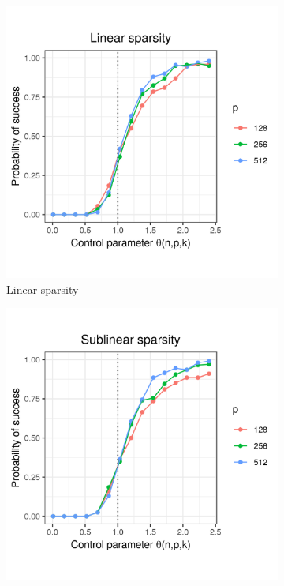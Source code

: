 \documentclass[letterpaper,12pt]{article}
\begin{document}
\begin{figure}[h]
  \centering
  \begin{subfigure}{0.32\textwidth}
    \includegraphics[width=0.9\linewidth]{nonuniform_linear_sparsity_alpha_1}
    \caption{Linear sparsity}
    \label{fig:nonuniform_linear_sparsity_alpha_1}
  \end{subfigure}
  \begin{subfigure}{0.32\textwidth}
    \includegraphics[width=0.9\linewidth]{nonuniform_sublinear_sparsity_alpha_1}

\end{subfigure}
\end{figure}
\end{document}
